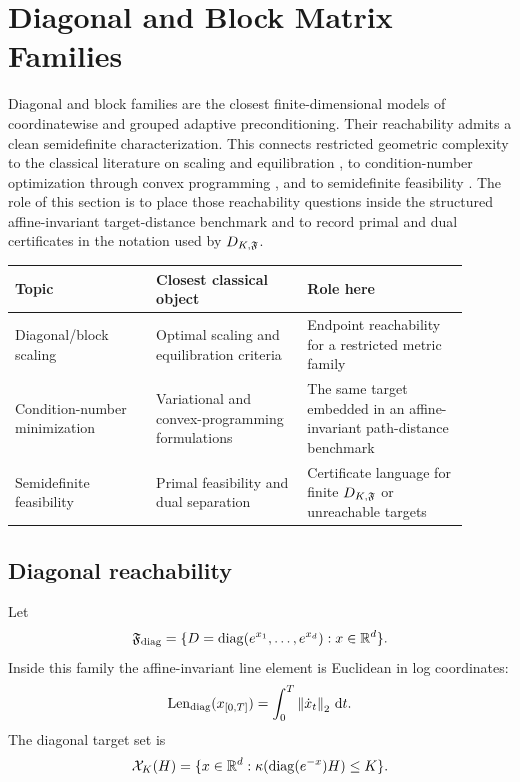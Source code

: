 \section{Diagonal and Block Matrix Families}
\label{sec:diag-block}

Diagonal and block families are the closest finite-dimensional models of
coordinatewise and grouped adaptive preconditioning. Their reachability admits a
clean semidefinite characterization. This connects restricted geometric
complexity to the classical literature on scaling and equilibration
\cite{bauer1963optimally,vandersluis1969equilibration,
shapiro1982optimally,shapiro1985block,sinkhorn1967doubly,
knight2013balancing,qu2024optimal}, to condition-number optimization through
convex programming \cite{marechal2009optimizing,lu2011minimizing}, and to
semidefinite feasibility \cite{vandenberghe1996semidefinite,boyd2004convex}.
The role of this section is to place those reachability questions inside the
structured affine-invariant target-distance benchmark and to record primal and
dual certificates in the notation used by \(D_{K,\mathfrak F}\).

\begin{center}
\begin{tabular}{p{0.28\linewidth}p{0.30\linewidth}p{0.32\linewidth}}
\toprule
Topic & Closest classical object & Role here \\
\midrule
Diagonal/block scaling &
Optimal scaling and equilibration criteria &
Endpoint reachability for a restricted metric family \\
Condition-number minimization &
Variational and convex-programming formulations &
The same target embedded in an affine-invariant path-distance benchmark \\
Semidefinite feasibility &
Primal feasibility and dual separation &
Certificate language for finite \(D_{K,\mathfrak F}\) or unreachable targets \\
\bottomrule
\end{tabular}
\end{center}

\subsection{Diagonal reachability}

Let
\[
  \mathfrak F_{\operatorname{diag}}=\{D=\operatorname{diag}(e^{x_1},\ldots,e^{x_d}):x\in\mathbb R^d\}.
\]
Inside this family the affine-invariant line element is Euclidean in log
coordinates:
\[
  \operatorname{Len}_{\operatorname{diag}}(x_{[0,T]})=\int_0^T\left\lVert \dot x_t\right\rVert_2\,\mathrm d t.
\]
The diagonal target set is
\[
  \mathcal X_K(H)=
  \{x\in\mathbb R^d:\kappa(\operatorname{diag}(e^{-x})H)\le K\}.
\]

